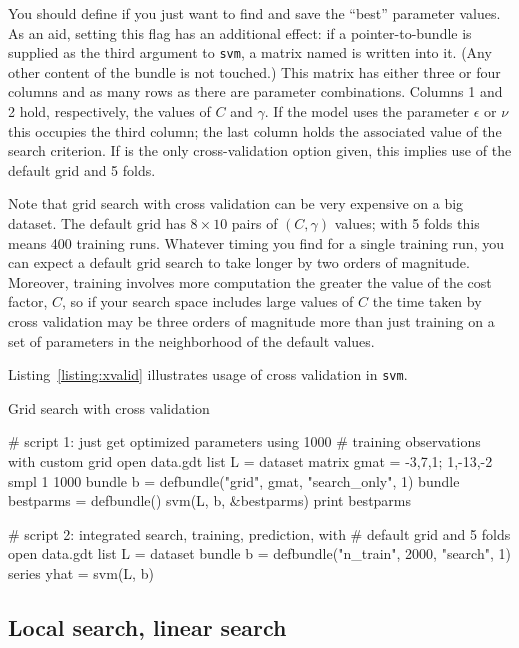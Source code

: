 \documentclass{article}
\begin{document}
You should define  if you just want to find and
save the ``best'' parameter values. As an aid, setting this flag has
an additional effect: if a pointer-to-bundle is supplied as the third
argument to \texttt{svm}, a matrix named  is
written into it. (Any other content of the bundle is not touched.)
This matrix has either three or four columns and as many rows as there
are parameter combinations. Columns 1 and 2 hold, respectively, the
values of $C$ and $\gamma$.  If the model uses the parameter
$\epsilon$ or $\nu$ this occupies the third column; the last column
holds the associated value of the search criterion.  If
 is the only cross-validation option given, this
implies use of the default grid and 5 folds.

Note that grid search with cross validation can be very expensive on a
big dataset. The default grid has $8 \times 10$ pairs of $(C, \gamma)$
values; with 5 folds this means 400 training runs. Whatever timing you
find for a single training run, you can expect a default grid search
to take longer by two orders of magnitude. Moreover, training involves
more computation the greater the value of the cost factor, $C$, so if
your search space includes large values of $C$ the time taken by cross
validation may be three orders of magnitude more than just training on
a set of parameters in the neighborhood of the default values.

Listing~\ref{listing:xvalid} illustrates usage of cross validation in
\texttt{svm}.

\begin{script}[htbp]
  \caption{Grid search with cross validation}
  \label{listing:xvalid}
\begin{scode}
# script 1: just get optimized parameters using 1000
# training observations with custom grid
open data.gdt
list L = dataset
matrix gmat = {-3,7,1; 1,-13,-2}
smpl 1 1000
bundle b = defbundle("grid", gmat, "search_only", 1)
bundle bestparms = defbundle()
svm(L, b, &bestparms)
print bestparms

# script 2: integrated search, training, prediction, with
# default grid and 5 folds
open data.gdt
list L = dataset
bundle b = defbundle("n_train", 2000, "search", 1)
series yhat = svm(L, b)
\end{scode}
\end{script}

\subsection{Local search, linear search}
\label{sec:local-search}
\end{document}
